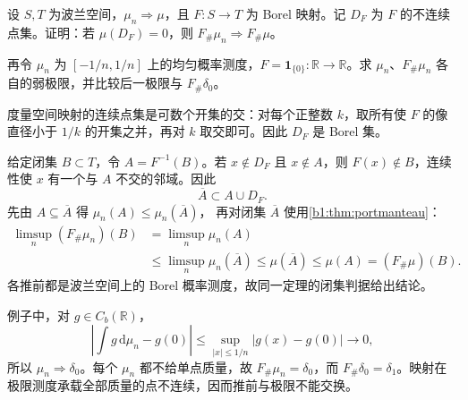 \begin{exercise}\label{b1:ex:12-discontinuous-mapping}
设 \(S,T\) 为波兰空间，\(\mu_n\Rightarrow\mu\)，且 \(F:S\rightarrow T\) 为 Borel 映射。记 \(D_F\) 为 \(F\) 的不连续点集。证明：若 \(\mu(D_F)=0\)，则 \(F_\#\mu_n\Rightarrow F_\#\mu\)。

\ProseParagraphBreak

再令 \(\mu_n\) 为 \([-1/n,1/n]\) 上的均匀概率测度，\(F=\mathbf1_{\{0\}}:\mathbb R\rightarrow\mathbb R\)。求 \(\mu_n\)、\(F_\#\mu_n\) 各自的弱极限，并比较后一极限与 \(F_\#\delta_0\)。
\end{exercise}
\begin{solution}
度量空间映射的连续点集是可数个开集的交：对每个正整数 \(k\)，取所有使 \(F\) 的像直径小于 \(1/k\) 的开集之并，再对 \(k\) 取交即可。因此 \(D_F\) 是 Borel 集。

给定闭集 \(B\subset T\)，令 \(A=F^{-1}(B)\)。若 \(x\notin D_F\) 且 \(x\notin A\)，则 \(F(x)\notin B\)，连续性使 \(x\) 有一个与 \(A\) 不交的邻域。因此
\[
 \overline A\subset A\cup D_F.
\]
先由 \(A\subseteq\overline A\) 得 \(\mu_n(A)\leq\mu_n(\overline A)\)，
再对闭集 \(\overline A\) 使用\cref{b1:thm:portmanteau}：
\[
 \begin{aligned}
 \limsup_n(F_\#\mu_n)(B)
 &=\limsup_n\mu_n(A)\\
 &\leq\limsup_n\mu_n(\overline A)
 \leq\mu(\overline A)\leq\mu(A)=(F_\#\mu)(B).
 \end{aligned}
\]
各推前都是波兰空间上的 Borel 概率测度，故同一定理的闭集判据给出结论。

例子中，对 \(g\in C_b(\mathbb R)\)，
\[
 \left|\int g\,\mathrm d\mu_n-g(0)\right|
 \le\sup_{|x|\le1/n}|g(x)-g(0)|\longrightarrow0,
\]
所以 \(\mu_n\Rightarrow\delta_0\)。每个 \(\mu_n\) 都不给单点质量，故 \(F_\#\mu_n=\delta_0\)，而 \(F_\#\delta_0=\delta_1\)。映射在极限测度承载全部质量的点不连续，因而推前与极限不能交换。
\end{solution}

